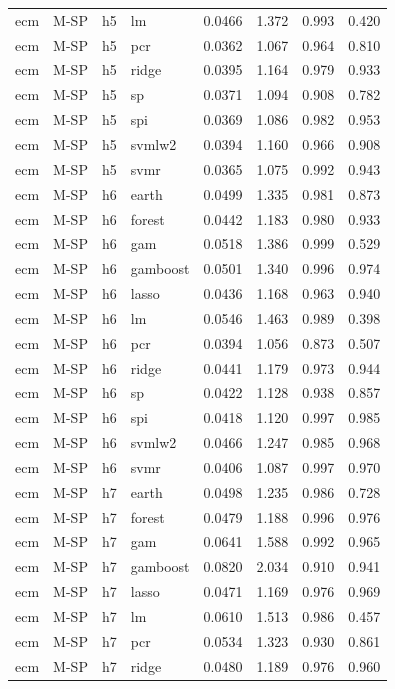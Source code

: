 \begin{ThreePartTable}
\begin{longtable}[t]{llclcccc}
ecm & M-SP & h5 & lm & 0.0466 & 1.372 & 0.993 & 0.420\\
ecm & M-SP & h5 & pcr & 0.0362 & 1.067 & 0.964 & 0.810\\
ecm & M-SP & h5 & ridge & 0.0395 & 1.164 & 0.979 & 0.933\\
ecm & M-SP & h5 & sp & 0.0371 & 1.094 & 0.908 & 0.782\\
ecm & M-SP & h5 & spi & 0.0369 & 1.086 & 0.982 & 0.953\\
ecm & M-SP & h5 & svmlw2 & 0.0394 & 1.160 & 0.966 & 0.908\\
ecm & M-SP & h5 & svmr & 0.0365 & 1.075 & 0.992 & 0.943\\
\addlinespace
ecm & M-SP & h6 & earth & 0.0499 & 1.335 & 0.981 & 0.873\\
ecm & M-SP & h6 & forest & 0.0442 & 1.183 & 0.980 & 0.933\\
ecm & M-SP & h6 & gam & 0.0518 & 1.386 & 0.999 & 0.529\\
ecm & M-SP & h6 & gamboost & 0.0501 & 1.340 & 0.996 & 0.974\\
ecm & M-SP & h6 & lasso & 0.0436 & 1.168 & 0.963 & 0.940\\
ecm & M-SP & h6 & lm & 0.0546 & 1.463 & 0.989 & 0.398\\
ecm & M-SP & h6 & pcr & 0.0394 & 1.056 & 0.873 & 0.507\\
ecm & M-SP & h6 & ridge & 0.0441 & 1.179 & 0.973 & 0.944\\
ecm & M-SP & h6 & sp & 0.0422 & 1.128 & 0.938 & 0.857\\
ecm & M-SP & h6 & spi & 0.0418 & 1.120 & 0.997 & 0.985\\
ecm & M-SP & h6 & svmlw2 & 0.0466 & 1.247 & 0.985 & 0.968\\
ecm & M-SP & h6 & svmr & 0.0406 & 1.087 & 0.997 & 0.970\\
\addlinespace
ecm & M-SP & h7 & earth & 0.0498 & 1.235 & 0.986 & 0.728\\
ecm & M-SP & h7 & forest & 0.0479 & 1.188 & 0.996 & 0.976\\
ecm & M-SP & h7 & gam & 0.0641 & 1.588 & 0.992 & 0.965\\
ecm & M-SP & h7 & gamboost & 0.0820 & 2.034 & 0.910 & 0.941\\
ecm & M-SP & h7 & lasso & 0.0471 & 1.169 & 0.976 & 0.969\\
ecm & M-SP & h7 & lm & 0.0610 & 1.513 & 0.986 & 0.457\\
ecm & M-SP & h7 & pcr & 0.0534 & 1.323 & 0.930 & 0.861\\
ecm & M-SP & h7 & ridge & 0.0480 & 1.189 & 0.976 & 0.960\\

\end{longtable}
\end{ThreePartTable}
